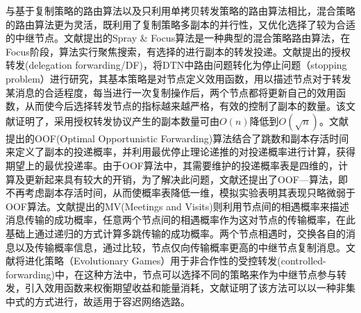 与基于复制策略的路由算法以及只利用单拷贝转发策略的路由算法相比，混合策略的路由算法更为灵活，既利用了复制策略多副本的并行性，又优化选择了较为合适的中继节点。文献提出的Spray \& Focus算法是一种典型的混合策略路由算法，在Focus阶段，算法实行聚焦搜索，有选择的进行副本的转发投递。文献提出的授权转发(delegation forwarding/DF)，将DTN中路由问题转化为停止问题（stopping problem）进行研究，其基本策略是对节点定义效用函数，用以描述节点对于转发某消息的合适程度，每当进行一次复制操作后，两个节点都将更新自己的效用函数，从而使今后选择转发节点的指标越来越严格，有效的控制了副本的数量。该文献证明了，采用授权转发协议产生的副本数量可由$O(n)$降低到$O(\sqrt{n})$。文献提出的OOF(Optimal Opportunistic Forwarding)算法结合了跳数和副本存活时间来定义了副本的投递概率，并利用最优停止理论递推的对投递概率进行计算，获得期望上的最优投递率。由于OOF算法中，其需要维护的投递概率表是四维的，计算及更新起来具有较大的开销，为了解决此问题，文献还提出了OOF—算法，即不再考虑副本存活时间，从而使概率表降低一维，模拟实验表明其表现只略微弱于OOF算法。文献提出的MV(Meetings and Visits)则利用节点间的相遇概率来描述消息传输的成功概率，任意两个节点间的相遇概率作为这对节点的传输概率，在此基础上通过递归的方式计算多跳传输的成功概率。两个节点相遇时，交换各自的消息以及传输概率信息，通过比较，节点仅向传输概率更高的中继节点复制消息。文献将进化策略（Evolutionary Games）用于非合作性的受控转发(controlled-forwarding)中，在这种方法中，节点可以选择不同的策略来作为中继节点参与转发，引入效用函数来权衡期望收益和能量消耗，文献证明了该方法可以以一种非集中式的方式进行，故适用于容迟网络选路。


